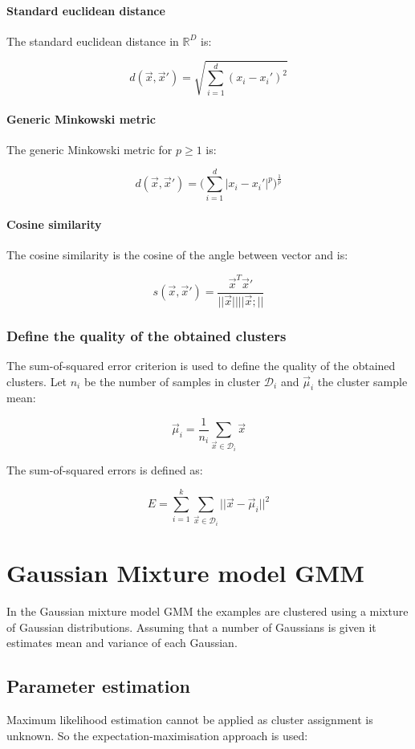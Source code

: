 			\paragraph{Standard euclidean distance}
			The standard euclidean distance in $\mathbb{R}^D$ is:

			$$d(\vec{x},\vec{x}') = \sqrt{\sum\limits_{i=1}^d(x_i-x_i')^2}$$

			\paragraph{Generic Minkowski metric}
			The generic Minkowski metric for $p\ge 1$ is:

			$$d(\vec{x},\vec{x}') = \biggl(\sum\limits_{i=1}^d|x_i-x_i'|^p\biggr)^\frac{1}{p}$$

			\paragraph{Cosine similarity}
			The cosine similarity is the cosine of the angle between vector and is:

			$$s(\vec{x},\vec{x}') = \frac{\vec{x}^T\vec{x}'}{||\vec{x}||||\vec{x};||}$$

		\subsubsection{Define the quality of the obtained clusters}
		The sum-of-squared error criterion is used to define the quality of the obtained clusters.
		Let $n_i$ be the number of samples in cluster $\mathcal{D}_i$ and $\vec{\mu}_i$ the cluster sample mean:

		$$\vec{\mu}_i = \frac{1}{n_i}\sum\limits_{\vec{x}\in\mathcal{D}_i}\vec{x}$$

		The sum-of-squared errors is defined as:

		$$E = \sum\limits_{i=1}^k\sum\limits_{\vec{x}\in\mathcal{D}_i}||\vec{x}-\vec{\mu}_i||^2$$

\section{Gaussian Mixture model GMM}
In the Gaussian mixture model GMM the examples are clustered using a mixture of Gaussian distributions.
Assuming that a number of Gaussians is given it estimates mean and variance of each Gaussian.

	\subsection{Parameter estimation}
	Maximum likelihood estimation cannot be applied as cluster assignment is unknown.
	So the expectation-maximisation approach is used:

